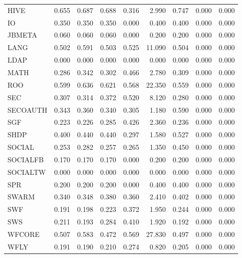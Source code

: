 \begin{tabular}{lrrrrrrrr}
HIVE          & 0.655 &      0.687 &   0.688 &   0.316 &       2.990 &          0.747 &        0.000 &           0.000 \\
IO            & 0.350 &      0.350 &   0.350 &   0.000 &       0.400 &          0.400 &        0.000 &           0.000 \\
JBMETA        & 0.060 &      0.060 &   0.060 &   0.000 &       0.200 &          0.200 &        0.000 &           0.000 \\
LANG          & 0.502 &      0.591 &   0.503 &   0.525 &      11.090 &          0.504 &        0.000 &           0.000 \\
LDAP          & 0.000 &      0.000 &   0.000 &   0.000 &       0.000 &          0.000 &        0.000 &           0.000 \\
MATH          & 0.286 &      0.342 &   0.302 &   0.466 &       2.780 &          0.309 &        0.000 &           0.000 \\
ROO           & 0.599 &      0.636 &   0.621 &   0.568 &      22.350 &          0.559 &        0.000 &           0.000 \\
SEC           & 0.307 &      0.314 &   0.372 &   0.520 &       8.120 &          0.280 &        0.000 &           0.000 \\
SECOAUTH      & 0.343 &      0.360 &   0.340 &   0.305 &       1.180 &          0.590 &        0.000 &           0.000 \\
SGF           & 0.223 &      0.226 &   0.285 &   0.426 &       2.360 &          0.236 &        0.000 &           0.000 \\
SHDP          & 0.400 &      0.440 &   0.440 &   0.297 &       1.580 &          0.527 &        0.000 &           0.000 \\
SOCIAL        & 0.253 &      0.282 &   0.257 &   0.265 &       1.350 &          0.450 &        0.000 &           0.000 \\
SOCIALFB      & 0.170 &      0.170 &   0.170 &   0.000 &       0.200 &          0.200 &        0.000 &           0.000 \\
SOCIALTW      & 0.000 &      0.000 &   0.000 &   0.000 &       0.000 &          0.000 &        0.000 &           0.000 \\
SPR           & 0.200 &      0.200 &   0.200 &   0.000 &       0.400 &          0.400 &        0.000 &           0.000 \\
SWARM         & 0.340 &      0.348 &   0.380 &   0.360 &       2.410 &          0.402 &        0.000 &           0.000 \\
SWF           & 0.191 &      0.198 &   0.223 &   0.372 &       1.950 &          0.244 &        0.000 &           0.000 \\
SWS           & 0.211 &      0.193 &   0.284 &   0.410 &       1.920 &          0.192 &        0.000 &           0.000 \\
WFCORE        & 0.507 &      0.583 &   0.472 &   0.569 &      27.830 &          0.497 &        0.000 &           0.000 \\
WFLY          & 0.191 &      0.190 &   0.210 &   0.274 &       0.820 &          0.205 &        0.000 &           0.000 \\
\bottomrule
\end{tabular}
